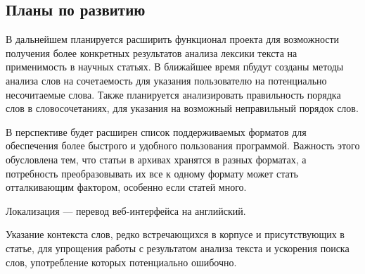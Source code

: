 \documentclass[a4paper,openbib]{report}
\begin{document}
\subsection*{Планы по развитию}

В дальнейшем планируется расширить функционал проекта для возможности получения более конкретных результатов анализа лексики текста на применимость в научных статьях.
В ближайшее время пбудут созданы методы анализа слов на сочетаемость для указания пользователю на потенциально несочитаемые слова.
Также планируется анализировать правильность порядка слов в словосочетаниях, для указания на возможный неправильный порядок слов.

В перспективе будет расширен список поддерживаемых форматов для обеспечения более быстрого и удобного пользования программой. Важность этого обусловлена тем, что статьи 
в архивах хранятся в разных форматах, а потребность преобразовывать их все к одному формату может стать отталкивающим фактором, особенно если статей много.

Локализация --- перевод веб-интерфейса на английский.

Указание контекста слов, редко встречающихся в корпусе и присутствующих в статье, для упрощения работы с результатом анализа текста и ускорения поиска слов, употребление 
которых потенциально ошибочно.
\end{document}
